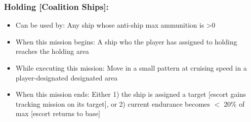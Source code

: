 \documentclass{article}
\begin{document}
    \subsubsection{Holding [Coalition Ships]:}
            \begin{itemize}
                \item{Can be used by:} Any ship whose anti-ship max ammunition is \textgreater 0
                \item{When this mission begins:} A ship who the player has assigned to holding reaches the holding area
                \item{While executing this mission:} Move in a small pattern at cruising speed in a player-designated designated area
                \item{When this mission ends:} Either 1) the ship is assigned a target [escort gains tracking mission on its target], or 2) current endurance becomes $<$ 20\% of max [escort returns to base]
            \end{itemize}
            
\end{document}
